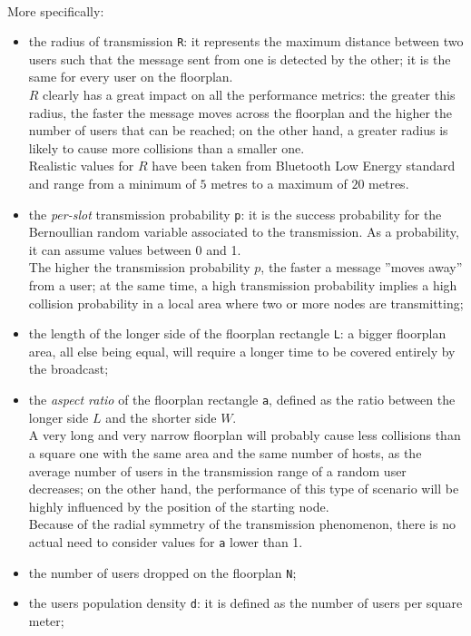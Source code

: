 \\
More specifically:
\begin{itemize}
	\item the radius of transmission \colorbox{gray!30}{\large \texttt{R}}: it
	represents the maximum distance between two users such that the message
	sent from one is detected by the other; it is the same for every user on
	the floorplan.\\
	$R$ clearly has a great impact on all
    the performance metrics: the greater this radius, the faster the message
    moves across the floorplan and the higher the number of users that can be
    reached; on the other hand, a greater radius is likely to cause more
    collisions than a smaller one. \\
	 Realistic values for $R$ have been taken from Bluetooth Low
	Energy standard and range from a minimum of $5$ metres to a maximum of $20$
	metres.
	\item the \textit{per-slot} transmission probability
	\colorbox{gray!30}{\large \texttt{p}}: it is the success probability for the
	Bernoullian random variable associated to the transmission. As a
	probability, it can assume values between 0 and 1.\\
	The higher the transmission probability $p$, the faster a message ”moves away”
	from a user; at the same time, a high transmission probability implies a
	high collision probability in a local area where two or more nodes are
	transmitting;
    \item the length of the longer side of the floorplan rectangle
    \colorbox{gray!30}{\large \texttt{L}}: a bigger floorplan area, all else
    being equal, will require a longer time to be covered entirely by the
    broadcast;
	\item the \textit{aspect ratio} of the floorplan rectangle
	\colorbox{gray!30}{\large \texttt{a}}, defined as the ratio between the
	longer side $L$ and the shorter side $W$.\\
	A very long and very narrow floorplan will probably cause less collisions
	than a square one with the same area and the same number of hosts, as the
	average number of users in the transmission range of a random user decreases;
	on the other hand, the performance of this type of scenario will be highly
	influenced by the position of the starting node.\\
	Because of the radial symmetry of the transmission phenomenon, there is no
	actual need to consider values for \texttt{a} lower than 1.
	\item the number of users dropped on the floorplan
	\colorbox{gray!30}{\large \texttt{N}};
	\item the users population density \colorbox{gray!30}{\large \texttt{d}}: it
	is defined as the number of users per square meter;
\end{itemize}
